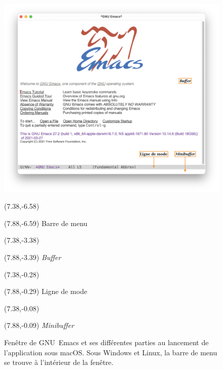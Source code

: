 \begin{figure}[t]
  \includegraphics{images/emacswindow-screenshot}

  \begingroup
  \begin{textblock}{0.35}(7.38,-6.58)
    \Large\faLongArrowRight
  \end{textblock}
  \begin{textblock}{1.75}(7.88,-6.59)
    \footnotesize\sffamily Barre de menu
  \end{textblock}

  \begin{textblock}{0.35}(7.38,-3.38)
    \Large\faLongArrowRight
  \end{textblock}
  \begin{textblock}{1.75}(7.88,-3.39)
    \footnotesize\sffamily \emph{Buffer}
  \end{textblock}

  \begin{textblock}{0.35}(7.38,-0.28)
    \Large\faLongArrowRight
  \end{textblock}
  \begin{textblock}{1.75}(7.88,-0.29)
    \footnotesize\sffamily Ligne de mode
  \end{textblock}

  \begin{textblock}{0.35}(7.38,-0.08)
    \Large\faLongArrowRight
  \end{textblock}
  \begin{textblock}{1.75}(7.88,-0.09)
    \footnotesize\sffamily \emph{Minibuffer}
  \end{textblock}
  \endgroup
  \caption[Fenêtre de GNU~Emacs sous macOS]{Fenêtre de GNU~Emacs et
    ses différentes parties au lancement de l'application sous macOS.
    Sous Windows et Linux, la barre de menu se trouve à l'intérieur de
    la fenêtre.}
  \label{fig:ess:emacswindow}
\end{figure}


